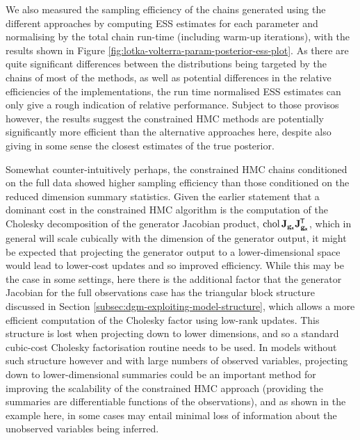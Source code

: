We also measured the sampling efficiency of the chains generated using the different approaches by computing \ac{ESS} estimates for each parameter and normalising by the total chain run-time (including warm-up iterations), with the results shown in Figure \ref{fig:lotka-volterra-param-posterior-ess-plot}. As there are quite significant differences between the distributions being targeted by the chains of most of the methods, as well as potential differences in the relative efficiencies of the implementations, the run time normalised \ac{ESS} estimates can only give a rough indication of relative performance. Subject to those provisos however, the results suggest the constrained \ac{HMC} methods are potentially significantly more efficient than the alternative approaches here, despite also giving in some sense the closest estimates of the true posterior. %

Somewhat counter-intuitively perhaps, the constrained \ac{HMC} chains conditioned on the full data showed higher sampling efficiency than those conditioned on the reduced dimension summary statistics. Given the earlier statement that a dominant cost in the constrained \ac{HMC} algorithm is the computation of the Cholesky decomposition of the generator Jacobian product, $\operatorname{chol} \mathbf{J}_{{\mathbf{g}}_{\boldsymbol{\mathsf{x}}}}\mathbf{J}_{{\mathbf{g}}_{\boldsymbol{\mathsf{x}}}}^{\mkern-1.5mu\mathsf{T}}$, which in general will scale cubically with the dimension of the generator output, it might be expected that projecting the generator output to a lower-dimensional space would lead to lower-cost updates and so improved efficiency. While this may be the case in some settings, here there is the additional factor that the generator Jacobian for the full observations case has the triangular block structure discussed in Section \ref{subsec:dgm-exploiting-model-structure}, which allows a more efficient computation of the Cholesky factor using low-rank updates. This structure is lost when projecting down to lower dimensions, and so a standard cubic-cost Cholesky factorisation routine needs to be used. In models without such structure however and with large numbers of observed variables, projecting down to lower-dimensional summaries could be an important method for improving the scalability of the constrained \ac{HMC} approach (providing the summaries are differentiable functions of the observations), and as shown in the example here, in some cases may entail minimal loss of information about the unobserved variables being inferred.


